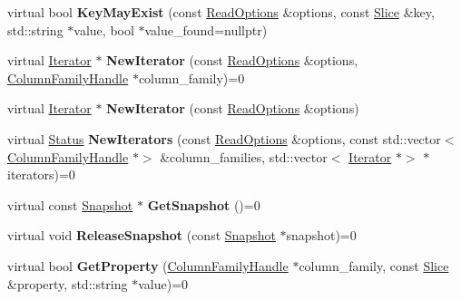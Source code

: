 \begin{DoxyCompactItemize}
\item 
virtual bool {\bfseries Key\+May\+Exist} (const \hyperlink{structrocksdb_1_1ReadOptions}{Read\+Options} \&options, const \hyperlink{classrocksdb_1_1Slice}{Slice} \&key, std\+::string $\ast$value, bool $\ast$value\+\_\+found=nullptr)\hypertarget{classrocksdb_1_1DB_a17165bfaf29a7b0b1fc36bf684954e53}{}\label{classrocksdb_1_1DB_a17165bfaf29a7b0b1fc36bf684954e53}

\item 
virtual \hyperlink{classrocksdb_1_1Iterator}{Iterator} $\ast$ {\bfseries New\+Iterator} (const \hyperlink{structrocksdb_1_1ReadOptions}{Read\+Options} \&options, \hyperlink{classrocksdb_1_1ColumnFamilyHandle}{Column\+Family\+Handle} $\ast$column\+\_\+family)=0\hypertarget{classrocksdb_1_1DB_ab76fb645ee6e5e1aa1e1b9f6f61c831a}{}\label{classrocksdb_1_1DB_ab76fb645ee6e5e1aa1e1b9f6f61c831a}

\item 
virtual \hyperlink{classrocksdb_1_1Iterator}{Iterator} $\ast$ {\bfseries New\+Iterator} (const \hyperlink{structrocksdb_1_1ReadOptions}{Read\+Options} \&options)\hypertarget{classrocksdb_1_1DB_a898a5baaba9ec5b0f451f2f8863ab79d}{}\label{classrocksdb_1_1DB_a898a5baaba9ec5b0f451f2f8863ab79d}

\item 
virtual \hyperlink{classrocksdb_1_1Status}{Status} {\bfseries New\+Iterators} (const \hyperlink{structrocksdb_1_1ReadOptions}{Read\+Options} \&options, const std\+::vector$<$ \hyperlink{classrocksdb_1_1ColumnFamilyHandle}{Column\+Family\+Handle} $\ast$$>$ \&column\+\_\+families, std\+::vector$<$ \hyperlink{classrocksdb_1_1Iterator}{Iterator} $\ast$$>$ $\ast$iterators)=0\hypertarget{classrocksdb_1_1DB_a1d8e4e97c149deaf44e4664f2b0efe9a}{}\label{classrocksdb_1_1DB_a1d8e4e97c149deaf44e4664f2b0efe9a}

\item 
virtual const \hyperlink{classrocksdb_1_1Snapshot}{Snapshot} $\ast$ {\bfseries Get\+Snapshot} ()=0\hypertarget{classrocksdb_1_1DB_a09ad7c62dfe7e8739732d37041d058f9}{}\label{classrocksdb_1_1DB_a09ad7c62dfe7e8739732d37041d058f9}

\item 
virtual void {\bfseries Release\+Snapshot} (const \hyperlink{classrocksdb_1_1Snapshot}{Snapshot} $\ast$snapshot)=0\hypertarget{classrocksdb_1_1DB_aedefaa4497eb584a45a818c0f05aff9b}{}\label{classrocksdb_1_1DB_aedefaa4497eb584a45a818c0f05aff9b}

\item 
virtual bool {\bfseries Get\+Property} (\hyperlink{classrocksdb_1_1ColumnFamilyHandle}{Column\+Family\+Handle} $\ast$column\+\_\+family, const \hyperlink{classrocksdb_1_1Slice}{Slice} \&property, std\+::string $\ast$value)=0\hypertarget{classrocksdb_1_1DB_a31f99bb093e4b586f3f10c04592043dc}{}\label{classrocksdb_1_1DB_a31f99bb093e4b586f3f10c04592043dc}


\end{DoxyCompactItemize}
